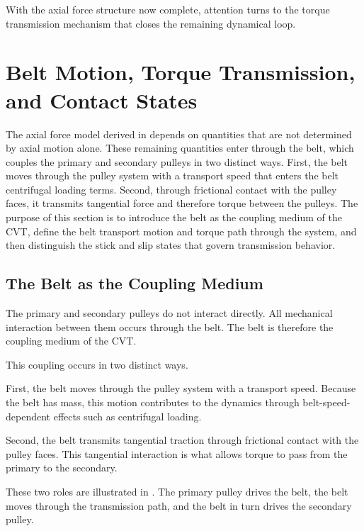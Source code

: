 \documentclass[11pt]{article}
\numberwithin{equation}{section}
\begin{document}
With the axial force structure now complete,
attention turns to the torque transmission mechanism
that closes the remaining dynamical loop.


\section{Belt Motion, Torque Transmission, and Contact States}
\label{sec:belt_motion_torque_transmission_contact_states}

The axial force model derived in  depends on quantities
that are not determined by axial motion alone. These remaining quantities
enter through the belt, which couples the primary and secondary pulleys in
two distinct ways. First, the belt moves through the pulley system with a
transport speed that enters the belt centrifugal loading terms. Second,
through frictional contact with the pulley faces, it transmits tangential
force and therefore torque between the pulleys. The purpose of this section
is to introduce the belt as the coupling medium of the CVT, define the
belt transport motion and torque path through the system, and then
distinguish the stick and slip states that govern transmission behavior.

\subsection{The Belt as the Coupling Medium}

The primary and secondary pulleys do not interact directly.
All mechanical interaction between them occurs through the belt.
The belt is therefore the coupling medium of the CVT.

This coupling occurs in two distinct ways.

First, the belt moves through the pulley system with a transport speed.
Because the belt has mass, this motion contributes to the dynamics through
belt-speed-dependent effects such as centrifugal loading.

Second, the belt transmits tangential traction through frictional contact
with the pulley faces. This tangential interaction is what allows torque
to pass from the primary to the secondary.

These two roles are illustrated in . The primary pulley
drives the belt, the belt moves through the transmission path, and the belt in
turn drives the secondary pulley.
\end{document}
